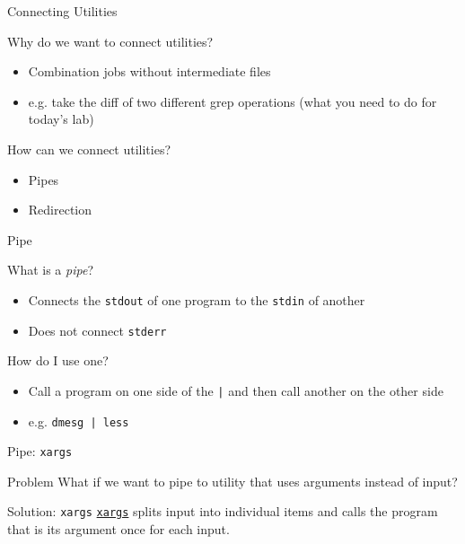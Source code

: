 \documentclass[table,dvipsnames]{beamer}
\begin{document}
\begin{frame}{Connecting Utilities}
	\begin{block}{Why do we want to connect utilities?}
		\begin{itemize}
			\item Combination jobs without intermediate files
			\item e.g. take the diff of two different grep operations (what you
				need to do for today's lab)
		\end{itemize}
	\end{block}
	\begin{block}{How can we connect utilities?}
		\begin{itemize}
			\item Pipes
			\item Redirection
		\end{itemize}
	\end{block}
\end{frame}

\begin{frame}{Pipe}
	\begin{block}{What is a \emph{pipe}?}
		\begin{itemize}
			\item Connects the \texttt{stdout} of one program to the
				\texttt{stdin} of another
			\item Does not connect \texttt{stderr}
		\end{itemize}
	\end{block}
	\begin{block}{How do I use one?}
		\begin{itemize}
			\item Call a program on one side of the \texttt{|} and then call
				another on the other side
			\item e.g. \texttt{dmesg | less}
		\end{itemize}
	\end{block}
\end{frame}

\begin{frame}{Pipe: \texttt{xargs}}
	\begin{block}{Problem}
		What if we want to pipe to utility that uses arguments instead of input?
	\end{block}
	\begin{block}{Solution: \texttt{xargs}}
		\href{http://en.wikipedia.org/wiki/Xargs}{\texttt{xargs}} splits input 
		into individual items and calls the program that is its argument once 
		for each input.
	\end{block}
\end{frame}
\end{document}
